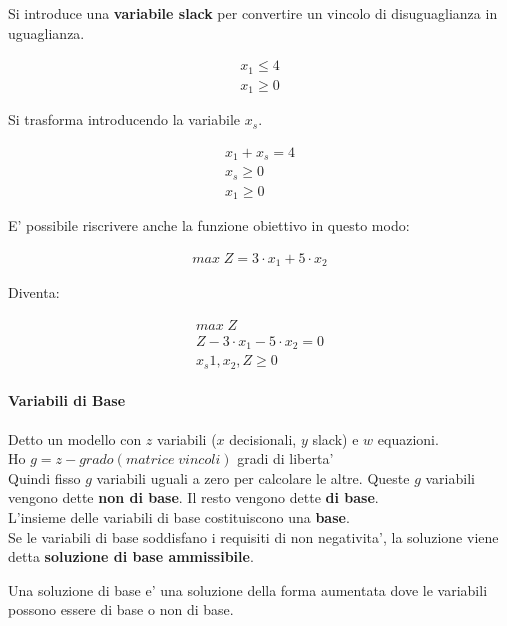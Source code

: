 Si introduce una \textbf{variabile slack} per convertire un vincolo di disuguaglianza in uguaglianza.

\begin{align}
    \text{$x_1 \leq 4$} \\
    \text{$x_1 \geq 0$}
\end{align}

Si trasforma introducendo la variabile $x_s$.

\begin{align}
    \text{$x_1 + x_s = 4$} \\
    \text{$x_s \geq 0$} \\
    \text{$x_1 \geq 0$}
\end{align}

E' possibile riscrivere anche la funzione obiettivo in questo modo:

\begin{align}
    \text{$max \; Z = 3 \cdot x_1 + 5 \cdot x_2$}
\end{align}

Diventa:

\begin{align}
    \text{$max \; Z$} \\
    \text{$Z - 3 \cdot x_1 - 5 \cdot x_2 = 0$} \\
    \text{$x_s1, x_2, Z \geq 0$}
\end{align}


\paragraph{Variabili di Base}

Detto un modello con $z$ variabili ($x$ decisionali, $y$ slack) e $w$ equazioni. \\
Ho $g = z - grado(matrice \; vincoli)$ gradi di liberta' \\
Quindi fisso $g$ variabili uguali a zero per calcolare le altre. Queste $g$ variabili vengono dette \textbf{non di base}. Il resto vengono dette \textbf{di base}. \\
L'insieme delle variabili di base costituiscono una \textbf{base}. \\
Se le variabili di base soddisfano i requisiti di non negativita', la soluzione viene detta \textbf{soluzione di base ammissibile}.

Una soluzione di base e' una soluzione della forma aumentata dove le variabili possono essere di base o non di base. \\

